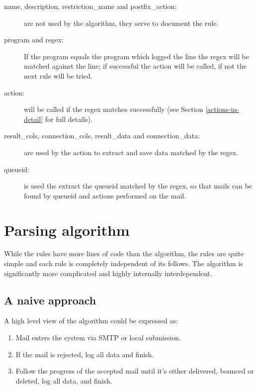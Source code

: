 \documentclass[a4paper,12pt,draft]{article}
\begin{document}
\begin{description}

    \item [name, description, restriction\_name and postfix\_action:] are
        not \newline used by the algorithm, they serve to document the rule.

    \item [program and regex:] If the program equals the program which
        logged the line the regex will be matched against the line; if
        successful the action will be called, if not the next rule will be
        tried.

    \item [action:] will be called if the regex matches successfully (see
        Section \ref{actions-in-detail} for full details).

    \item [result\_cols, connection\_cols, result\_data and
        connection\_data:] are \newline used by the action to extract and
        save data matched by the regex.

    \item [queueid:] is used the extract the queueid matched by the regex,
        so that mails can be found by queueid and actions performed on the
        mail.

\end{description}



\section{Parsing algorithm}

\label{parsing-algorithm}

While the rules have more lines of code than the algorithm, the rules are
quite simple and each rule is completely independent of its fellows.  The
algorithm is significantly more complicated and highly internally
interdependent.


\subsection{A naive approach}

A high level view of the algorithm could be expressed as:

\begin{enumerate}

    \item Mail enters the system via SMTP or local submission.

    \item If the mail is rejected, log all data and finish.

    \item Follow the progress of the accepted mail until it's either
        delivered, bounced or deleted, log all data, and finish.

\end{enumerate}
\end{document}
